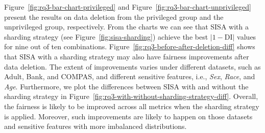 Figure~\ref{fig:rq3-bar-chart-privileged} and Figure~\ref{fig:rq3-bar-chart-unprivileged} present the results on data deletion from the privileged group and the unprivileged group, respectively.
From the charts we can see that SISA with a sharding strategy (see Figure~\ref{fig:sisa-sharding}) achieve the best $|1-\textrm{DI}|$ values for nine out of ten combinations. 
Figure~\ref{fig:rq3-before-after-deletion-diff} shows that SISA with a sharding strategy may also have fairness improvements after data deletion. The extent of improvements varies under different datasets, such as Adult, Bank, and COMPAS, and different sensitive features, i.e., \textit{Sex}, \textit{Race}, and \textit{Age}. Furthermore, we plot the differences between SISA with and without the sharding strategy in Figure~\ref{fig:rq3-with-without-sharding-strategy-diff}. Overall, the fairness is likely to be improved across all metrics when the sharding strategy is applied. Moreover, such improvements are likely to happen on those datasets and sensitive features with more imbalanced distributions.

